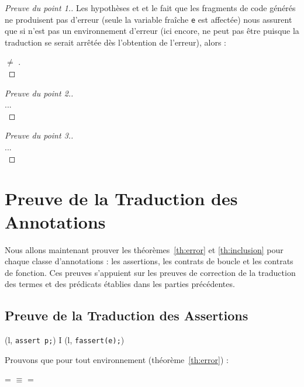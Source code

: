 \begin{proof}[Preuve du point 1.]
  Les hypothèses  et  et le fait que les fragments de
  code générés ne produisent pas d'erreur (seule la variable fraîche
  \lstinline'e' est affectée) nous assurent que si \env n'est pas un
  environnement d'erreur (ici encore, \env ne peut pas être \errorenv puisque la
  traduction se serait arrêtée dès l'obtention de l'erreur), alors :

   $\neq$ \errorenv.
  ~\\
\end{proof}


\begin{proof}[Preuve du point 2.]~\\
  ...
~\\
\end{proof}

\begin{proof}[Preuve du point 3.]~\\
  ...
~\\
\end{proof}


\section{Preuve de la Traduction des Annotations}
\label{sec:annotation-translation}


Nous allons maintenant prouver les théorèmes~\ref{th:error} et
\ref{th:inclusion} pour chaque classe d'annotations : les assertions, les
contrats de boucle et les contrats de fonction.
Ces preuves s'appuient sur les preuves de correction de la traduction des termes
et des prédicats établies dans les parties précédentes.


\subsection{Preuve de la Traduction des Assertions}


{
  {(l, \mbox{\lstinline'assert p;'})
     I \concat (l, \mbox{\lstinline'fassert(e);'})}
}


Prouvons que pour tout environnement \env (théorème~\ref{th:error}) :

 = \errorenv
$\equiv$ 
= \errorenv

